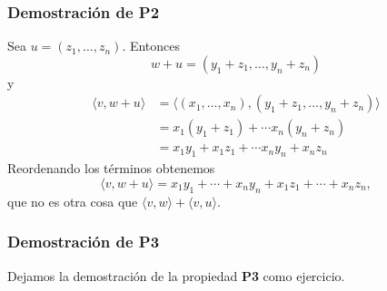 \documentclass[handout]{beamer} %
\begin{document}
\begin{frame}\frametitle{Demostración de \textbf{P2}}
	
	\pause
	Sea $u = (z_1, \ldots, z_n)$. Entonces
	\begin{equation*}
	w + u = (y_1+z_1, \ldots, y_n+ z_n)
	\end{equation*}
	y
	\begin{align*}
	\langle v , w + u \rangle &= \langle (x_1, \ldots,x_n) , (y_1+z_1, \ldots, y_n+ z_n) \rangle\\
	&= x_1(y_1+z_1) + \cdots x_n(y_n+z_n) \\
	&= x_1y_1+x_1z_1 + \cdots x_ny_n+x_nz_n
	\end{align*}\pause
	Reordenando los términos obtenemos
	\begin{equation*}
	\langle v , w + u \rangle =  x_1y_1+\cdots +  x_ny_n +x_1z_1 + \cdots+x_nz_n,
	\end{equation*}
	que no es otra cosa que $\langle v , w \rangle + \langle v , u \rangle$.
\end{frame}



\begin{frame}\frametitle{Demostración de \textbf{P3}}
		\pause
		Dejamos la demostración de la propiedad \textbf{P3} como ejercicio.
\end{frame}



\end{document}
